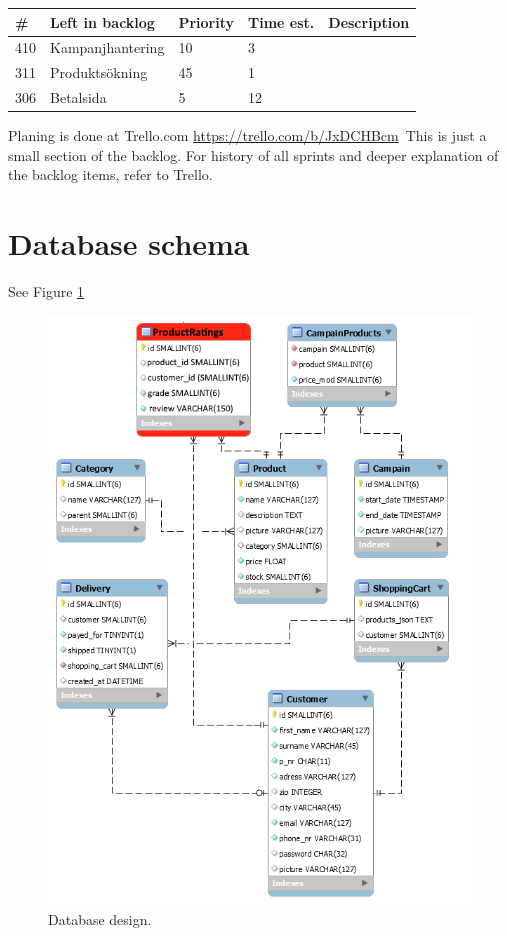\documentclass[paper=a4, fontsize=11pt]{report} %
\begin{document}
\begin{itemize}
	\begin{tabular}{|l|l|l|l|l|}
		 \hline
		 \#  & Left in backlog  & Priority & Time est. & Description \\ \hline
		 410 & Kampanjhantering & 10       & 3         &             \\ \hline
		 311 & Produktsökning   & 45       & 1         &             \\ \hline
		 306 & Betalsida        & 5        & 12        &             \\ \hline
	\end{tabular}


	Planing is done at Trello.com
	\url{https://trello.com/b/JxDCHBcm}\
	This is just a small section of the backlog. For history of all sprints and deeper
	explanation of the backlog items, refer to Trello.

\section*{Database schema}
See Figure \ref{fig:6}
\begin{figure}
	\includegraphics[scale=0.7]{artifacts/db_implemented_1_3.png}
	\caption{Database design.}
	\label{fig:6}
\end{figure}


\end{itemize}
\end{document}
